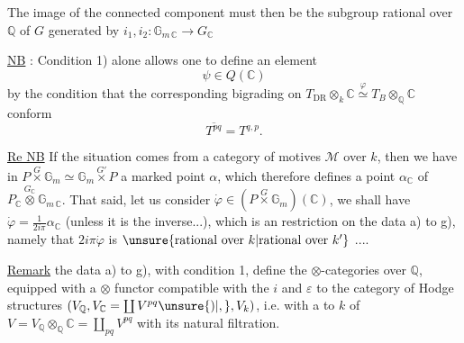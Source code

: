
The image  of the connected component must then be the subgroup rational over $\mathbb Q$ of $G$ generated by $i_1,i_2\colon\mathbb G_{m\,\mathbb C}\longrightarrow G_{\mathbb C}$ 

\uline{NB} : Condition 1) alone allows one to define an element
\[
\psi\in Q(\mathbb C)
\]
by the condition that the corresponding bigrading on $T_{\mathrm{DR}}\otimes_k\mathbb C\overset{\varphi}{\simeq}T_B\otimes_{\mathbb Q}\mathbb C$ conform 
\[
\overline{T^{pq}}=T^{q,p}.
\]

\uline{Re NB} If  the situation  comes from a category of motives $\mathcal M$ over $k$, then we have in $P\overset{G}{\times}\mathbb G_m\simeq\mathbb G_m\overset{G'}{\times}P$ a marked point $\alpha$, which therefore defines a point $\alpha_{\mathbb C}$ of $P_{\mathbb C}\overset{G_{\mathbb C}}{\otimes}\mathbb G_{m\,\mathbb C}$. That said, let us consider $\dot{\varphi}\in(P\overset{G}{\times}\mathbb G_m)(\mathbb C)$, we shall have $\dot{\varphi}=\frac{1}{2i\pi}\alpha_{\mathbb C}$ (unless it is the inverse...), which is an  restriction on the data a) to g), namely that $2i\pi\dot{\varphi}$ is $\unsure{\mathrm{rational\ over\ }k|\mathrm{rational\ over\ }k^{\smash{\prime}}}$ ....

\uline{Remark} the data a) to g), with condition 1, define the  $\otimes$-categories over $\mathbb Q$,  equipped with a $\otimes$ functor compatible with the $i$ and $\varepsilon$ to the category of  Hodge structures $(V_{\mathbb Q},V_{\mathbb C}=\coprod V^{pq}\unsure{)|,},V_k)$, i.e. with a    to $k$ of  $V=V_{\mathbb Q}\otimes_{\mathbb Q}\mathbb C=\coprod_{pq}V^{pq}$ with its natural filtration.
{\centering %
\textit{ }\par}

